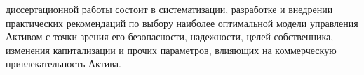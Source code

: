 диссертационной работы состоит в систематизации, разработке и внедрении практических рекомендаций по выбору наиболее оптимальной модели управления Активом с точки зрения его безопасности, надежности, целей собственника, изменения капитализации и прочих параметров, влияющих на коммерческую привлекательность Актива.